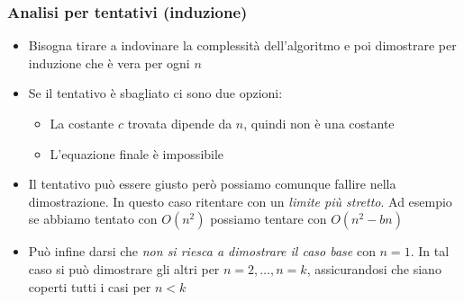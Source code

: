 \subsubsection{ Analisi per tentativi (induzione)}
\begin{itemize}
	\item Bisogna tirare a indovinare la complessità dell'algoritmo e poi dimostrare per induzione che è vera per ogni $ n $
	\item Se il tentativo è sbagliato ci sono due opzioni:
	      \begin{itemize}
		      \item La costante $ c $ trovata dipende da $ n $, quindi non è una costante
		      \item L'equazione finale è impossibile
	      \end{itemize}
	\item Il tentativo può essere giusto però possiamo comunque fallire nella dimostrazione. In questo caso ritentare con un \textit{limite più stretto}. Ad esempio se abbiamo tentato con $ O\left(n^2 \right) $ possiamo tentare con $ O\left(n^2  - bn\right) $
	\item Può infine darsi che \textit{non si riesca a dimostrare il caso base} con $ n = 1 $. In tal caso si può dimostrare gli altri per $ n=2, \ldots , n=k $, assicurandosi che siano coperti tutti i casi per $ n<k $
\end{itemize}

